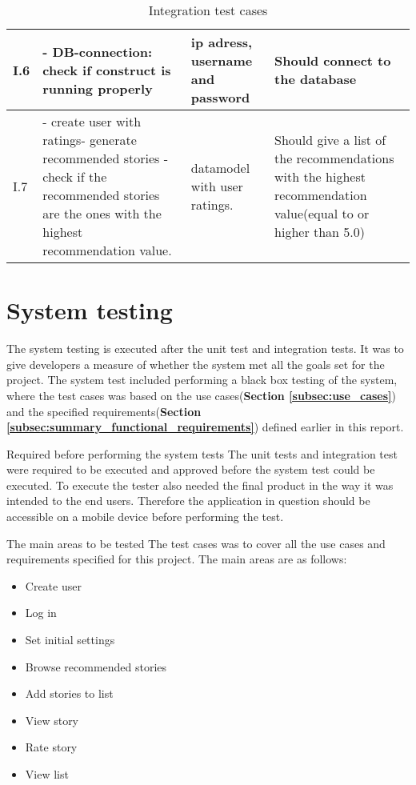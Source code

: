 \begin{table}[!h]
\begin{tabular}{ | p{1cm} | p{6.5cm} | p{3cm} | p{6.5cm} |}
			I.6 & - DB-connection: check if construct is running properly & ip adress, username and password & Should connect to the database \\ \hline
			
			I.7 & - create user with ratings\newline - generate recommended stories \newline - check if the recommended stories are the ones with the highest recommendation value. & datamodel with user ratings. & Should give a list of the recommendations with the highest recommendation value(equal to or higher than 5.0)  \\ \hline
		\end{tabular}
	\caption{Integration test cases}
	\label{Tab:integrationtestcases}
\end{table}

\section{System testing}

The system testing is executed after the unit test and integration tests. It was to give developers a measure of whether the system met all the goals set for the project.  The system test included performing a black box testing of the system, where the test cases was based on the use cases(\textbf{Section \ref{subsec:use_cases}}) and the specified requirements(\textbf{Section \ref{subsec:summary_functional_requirements}})  defined earlier in this report. \newline

Required before performing the system tests\newline
The unit tests and integration test were required to be executed and approved before the system test could be executed. To execute the tester also needed the final product in the way it was intended to the end users. Therefore the application in question should be accessible on a mobile device before performing the test. \newline

The main areas to be tested\newline
The test cases was to cover all the use cases and requirements specified for this project. The main areas are as follows:
\begin{itemize}
	\item Create user
	\item Log in
	\item Set initial settings
	\item Browse recommended stories
	\item Add stories to list
	\item View story
	\item Rate story 
	\item View list \newline
\end{itemize}

